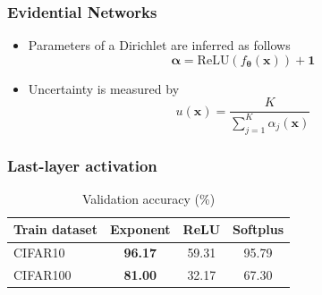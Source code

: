 \documentclass[]{beamer}
\begin{document}
\begin{frame} \frametitle{Evidential Networks}
\begin{itemize}
    \item Parameters of a Dirichlet are inferred as follows
    $$\boldsymbol{\alpha} = \mathrm{ReLU}(f_{\boldsymbol{\theta}}(\boldsymbol{x})) + \boldsymbol{1}$$
    \item Uncertainty is measured by
    $$u(\boldsymbol{x}) = \frac{K}{\sum\limits_{j=1}^K \alpha_j(\boldsymbol{x})}$$
\end{itemize}
\end{frame}


\begin{frame} \frametitle{Last-layer activation}
\begin{table}[H]
    \caption{Validation accuracy (\%)}
    \begin{center}
    \begin{small}
        \begin{tabular}{ l | c c c }
        \toprule
            Train dataset & Exponent & ReLU & Softplus \\
            \midrule
            CIFAR10  & \bf{96.17} & 59.31 & 95.79 \\
            CIFAR100 & \bf{81.00} & 32.17 & 67.30 \\
            \bottomrule
        \end{tabular}
    \end{small}
    \end{center}
\end{table}
\end{frame}
\end{document}
